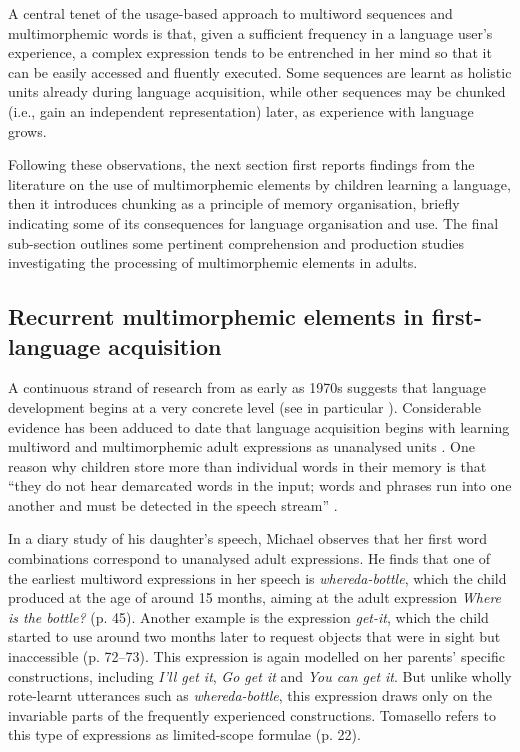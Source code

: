 A central tenet of the usage-based approach to multiword sequences and multimorphemic words is that, given a sufficient frequency in a language user's experience, a complex expression tends to be entrenched in her mind so that it can be easily accessed and fluently executed. Some sequences are learnt as holistic units already during  language acquisition, while other sequences may be chunked (i.e., gain an independent representation) later, as experience with language grows. 

Following these observations, the next section first reports findings from the literature on the use of multimorphemic elements by children learning a language, then it introduces chunking as a principle of memory organisation, briefly indicating some of its consequences for language organisation and use. The final sub-section outlines some pertinent comprehension and production studies investigating the processing of multimorphemic elements in adults. 

\subsection{Recurrent multimorphemic elements in first-language acquisition}
A continuous strand of research from as early as 1970s suggests that language development begins at a very concrete level (see in particular \citealt{bowerman-1973,clark-1974,braine-1976,tomasello-1992,pine-lieven-1993,dabrowska-lieven-2005}). Considerable evidence has been adduced to date that language acquisition begins with learning multiword and multimorphemic adult expressions as unanalysed units \citep{lieven-pine-baldwin-1997,dabrowska-2004,bannard-matthews-2008,lieven-salomo-tomasello-2009,arnon-clark-2011}. One reason why children store more than individual words in their memory is that ``they do not hear demarcated words in the input; words and phrases run into one another and must be detected in the speech stream'' \citep{bannard-matthews-2008}.

In a diary study of his daughter's speech, Michael \citet{tomasello-1992} observes that her first word combinations correspond to unanalysed adult expressions. He finds that one of the earliest multiword expressions in her speech is \textit{whereda-bottle}, which the child produced at the age of around 15 months, aiming at the adult expression \textit{Where is the bottle?} (p. 45). Another example is the expression \textit{get-it}, which the child started to use around two months later to request objects that were in sight but inaccessible (p. 72--73). This expression is again modelled on her parents' specific constructions, including \textit{I'll get it}, \textit{Go get it} and \textit{You can get it}. But unlike wholly rote-learnt utterances such as \textit{whereda-bottle}, this expression draws only on the invariable parts of the frequently experienced constructions. Tomasello refers to this type of expressions as limited-scope formulae (p. 22).

